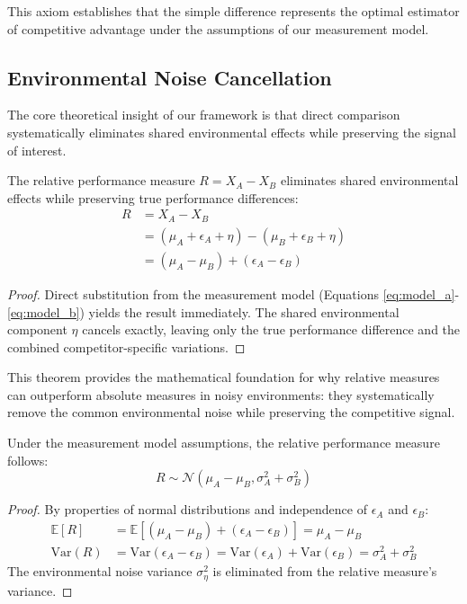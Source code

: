 This axiom establishes that the simple difference represents the optimal estimator of competitive advantage under the assumptions of our measurement model.

\subsection{Environmental Noise Cancellation}

The core theoretical insight of our framework is that direct comparison systematically eliminates shared environmental effects while preserving the signal of interest.

\begin{theorem}
\label{thm:env_cancel}
The relative performance measure $R = X_A - X_B$ eliminates shared environmental effects while preserving true performance differences:
\begin{align}
R &= X_A - X_B \nonumber \\
&= (\mu_A + \epsilon_A + \eta) - (\mu_B + \epsilon_B + \eta) \nonumber \\
&= (\mu_A - \mu_B) + (\epsilon_A - \epsilon_B) \label{eq:env_cancel}
\end{align}
\end{theorem}

\begin{proof}
Direct substitution from the measurement model (Equations \ref{eq:model_a}-\ref{eq:model_b}) yields the result immediately. The shared environmental component $\eta$ cancels exactly, leaving only the true performance difference and the combined competitor-specific variations.
\end{proof}

This theorem provides the mathematical foundation for why relative measures can outperform absolute measures in noisy environments: they systematically remove the common environmental noise while preserving the competitive signal.

\begin{corollary}
Under the measurement model assumptions, the relative performance measure follows:
$$R \sim \mathcal{N}(\mu_A - \mu_B, \sigma_A^2 + \sigma_B^2)$$
\end{corollary}

\begin{proof}
By properties of normal distributions and independence of $\epsilon_A$ and $\epsilon_B$:
\begin{align}
\mathbb{E}[R] &= \mathbb{E}[(\mu_A - \mu_B) + (\epsilon_A - \epsilon_B)] = \mu_A - \mu_B \\
\text{Var}(R) &= \text{Var}(\epsilon_A - \epsilon_B) = \text{Var}(\epsilon_A) + \text{Var}(\epsilon_B) = \sigma_A^2 + \sigma_B^2
\end{align}
The environmental noise variance $\sigma_\eta^2$ is eliminated from the relative measure's variance.
\end{proof}

